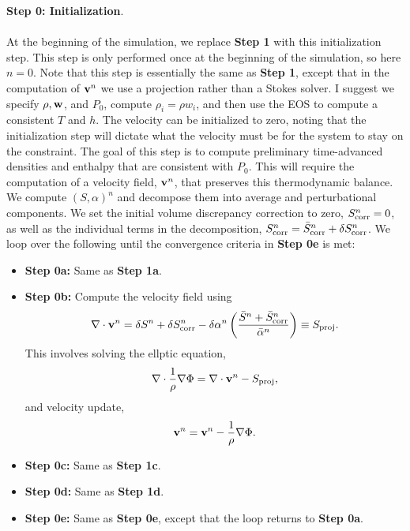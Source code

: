 \documentclass[final]{siamltex}
\def\vb {{\bf v}}
\def\wb {{\bf w}}
\begin{document}
{\bf Step 0: Initialization}.\\ \\
At the beginning of the simulation, we replace {\bf Step 1} with this initialization step.
This step is only performed once at the beginning of the simulation, so here $n=0$.
Note that this step is essentially the same as
{\bf Step 1}, except that in the computation of $\vb^n$ we use a projection rather
than a Stokes solver.
I suggest we specify $\rho,\wb$, and $P_0$, compute $\rho_i = \rho w_i$,
and then use the EOS to compute a consistent
$T$ and $h$.  The velocity can be initialized to zero, noting that the
initialization step will dictate what the velocity must be for the system to stay
on the constraint.
The goal of this step is to compute preliminary time-advanced densities and enthalpy
that are consistent with $P_0$.  This will
require the computation of a velocity field, $\vb^n$, that preserves this
thermodynamic balance.
We compute $(S,\alpha)^n$ and decompose them
into average and perturbational components.
We set the initial volume discrepancy correction to zero, 
$S_{\rm corr}^n = 0$, as well as the individual terms in the decomposition,
$S_{\rm corr}^n = \bar{S}_{\rm corr}^n + \delta S_{\rm corr}^n$.
We loop over the following until the convergence criteria in {\bf Step 0e} is met:\\
\begin{itemize}
\item {\bf Step 0a:} Same as {\bf Step 1a}.
\item {\bf Step 0b:} Compute the velocity field using
\begin{equation}
\nabla\cdot\vb^n = \delta S^n + \delta S_{\rm corr}^n - \delta\alpha^n\left(\frac{\bar{S}^n + \bar{S}_{\rm corr}^n}{\bar{\alpha}^n}\right) \equiv S_{\rm proj}.
\end{equation}
This involves solving the ellptic equation,
\begin{equation}
\nabla\cdot\frac{1}{\rho}\nabla\Phi = \nabla\cdot\vb^n - S_{\rm proj},
\end{equation}
and velocity update,
\begin{equation}
\vb^n = \vb^n - \frac{1}{\rho}\nabla\Phi.
\end{equation}

\item {\bf Step 0c:} Same as {\bf Step 1c}.
\item {\bf Step 0d:} Same as {\bf Step 1d}.
\item {\bf Step 0e:} Same as {\bf Step 0e}, except that the loop returns to {\bf Step 0a}.
\end{itemize}
\end{document}
